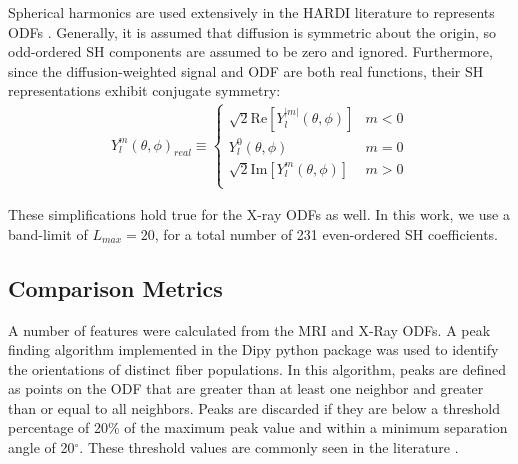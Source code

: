 \documentclass[11pt]{article}
\begin{document}
Spherical harmonics are used extensively in the HARDI literature
to represents ODFs \cite{Tournier2004}. Generally, it is assumed that diffusion is symmetric
about the origin, so odd-ordered SH components are assumed to be zero and ignored. Furthermore,
since the diffusion-weighted signal and ODF are both real functions, their SH representations
exhibit conjugate symmetry:
\begin{align}
  Y_{l}^m(\theta, \phi)_{real} \equiv
  \begin{cases}
    \sqrt{2}\text{Re}\left[Y_l^{|m|}(\theta, \phi)\right] & m < 0\\
    Y_l^0(\theta, \phi) & m = 0\\
    \sqrt{2}\text{Im}\left[Y_l^m(\theta, \phi)\right] & m > 0\\
  \end{cases}
  \label{eq:real_Y}
\end{align}

These simplifications hold true for the X-ray ODFs as well. In this work, we use a
band-limit of $L_{max} = 20$, for a total number of 231 even-ordered SH coefficients. 

\subsection{Comparison Metrics}
A number of features were calculated from the MRI and X-Ray ODFs. A peak finding
algorithm implemented in the Dipy python package \cite{Garyfallidis2014} was
used to identify the orientations of distinct fiber populations. In this
algorithm, peaks are defined as points on the ODF that are greater than at least
one neighbor and greater than or equal to all neighbors. Peaks are discarded if
they are below a threshold percentage of 20\% of the maximum peak value and
within a minimum separation angle of 20$^{\circ}$. These threshold values are
commonly seen in the literature \cite{Daducci2014, Schilling2018}.
\end{document}
